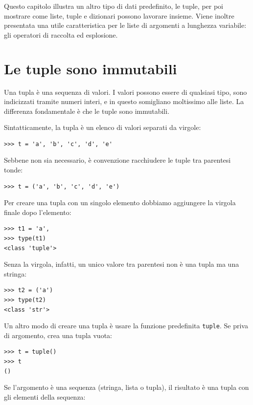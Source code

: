 \documentclass[10pt]{book}
\begin{document}
Questo capitolo illustra un altro tipo di dati predefinito, le tuple, per poi mostrare come liste, tuple e dizionari possono lavorare insieme. Viene inoltre presentata una utile caratteristica per le liste di argomenti a lunghezza variabile: gli operatori di raccolta ed esplosione.

\section{Le tuple sono immutabili}

Una tupla è una sequenza di valori. I valori possono essere di qualsiasi tipo, sono indicizzati tramite numeri interi, e in questo somigliano moltissimo alle liste. La differenza fondamentale è che le tuple sono immutabili.

Sintatticamente, la tupla è un elenco di valori separati da virgole:

\begin{verbatim}
>>> t = 'a', 'b', 'c', 'd', 'e'
\end{verbatim}
%
Sebbene non sia necessario, è convenzione racchiudere le tuple tra
   parentesi tonde:

\begin{verbatim}
>>> t = ('a', 'b', 'c', 'd', 'e')
\end{verbatim}
%
Per creare una tupla con un singolo elemento dobbiamo aggiungere la
   virgola finale dopo l'elemento:

\begin{verbatim}
>>> t1 = 'a',
>>> type(t1)
<class 'tuple'>
\end{verbatim}
%
Senza la virgola, infatti, un unico valore tra parentesi non è una tupla ma una stringa:

\begin{verbatim}
>>> t2 = ('a')
>>> type(t2)
<class 'str'>
\end{verbatim}
%
Un altro modo di creare una tupla è usare la funzione predefinita {\tt tuple}.
Se priva di argomento, crea una tupla vuota:

\begin{verbatim}
>>> t = tuple()
>>> t
()
\end{verbatim}
%
Se l'argomento è una sequenza (stringa, lista o tupla), il risultato è una tupla con gli elementi della sequenza:
\end{document}
